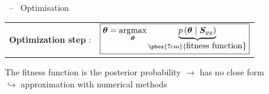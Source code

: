 \documentclass[10pt,xcolor=x11names,compress, show notes]{beamer}%
\begin{document}
\begin{frame}{\insertsectionhead ~--~ Optimisation}
	\centering
	\vfill	
	\begin{tabular}{c c}
		\textbf{Optimization step }:&
		$\boxed{ \displaystyle  \bm{\theta} =\underset{\bm{\theta}}{\arg\!\max} \underbrace{p\left( \bm{\theta} \mid \bm{S}_{yy}\right)}_{ \text{\pbox{7cm}{\centering \normalsize fitness function}}}}$ %
	\end{tabular}
	\vfill
	The fitness function is the posterior probability $\rightarrow$ has no close form\\
	$\hookrightarrow$ approximation with numerical methods
	


\end{frame}
\end{document}
